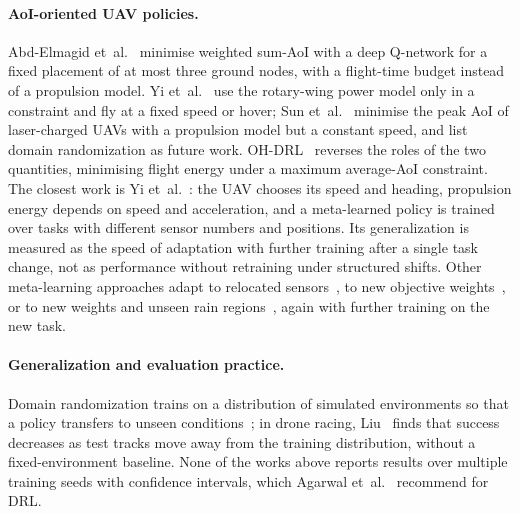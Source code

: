 \paragraph{AoI-oriented UAV policies.}
Abd-Elmagid et~al.~\cite{abdelmagid2019deep} minimise weighted sum-AoI with a deep
Q-network for a fixed placement of at most three ground nodes, with a flight-time budget
instead of a propulsion model.
Yi et~al.~\cite{yi2020deep} use the rotary-wing power model only in a constraint and
fly at a fixed speed or hover; Sun et~al.~\cite{sun2025aoi} minimise the peak AoI
of laser-charged UAVs with a propulsion model but a constant speed, and list domain
randomization as future work.
OH-DRL~\cite{ohdrl2025} reverses the roles of the two quantities, minimising flight energy
under a maximum average-AoI constraint.
The closest work is Yi et~al.~\cite{yi2023meta}: the UAV chooses its speed and heading,
propulsion energy depends on speed and acceleration, and a meta-learned policy is trained
over tasks with different sensor numbers and positions. Its generalization is measured as
the speed of adaptation with further training after a single task change, not as
performance without retraining under structured shifts.
Other meta-learning approaches adapt to relocated sensors~\cite{xiao2024meta}, to new
objective weights~\cite{sarathchandra2025age}, or to new weights and unseen rain
regions~\cite{eldeeb2026resilient}, again with further training on the new task.

\paragraph{Generalization and evaluation practice.}
Domain randomization trains on a distribution of simulated environments so that a policy
transfers to unseen conditions~\cite{tobin2017domain}; in drone racing,
Liu~\cite{liu2024generalizable} finds that success decreases as test tracks move away from
the training distribution, without a fixed-environment baseline.
None of the works above reports results over multiple training seeds with confidence
intervals, which Agarwal et~al.~\cite{agarwal2021deep} recommend for DRL.

